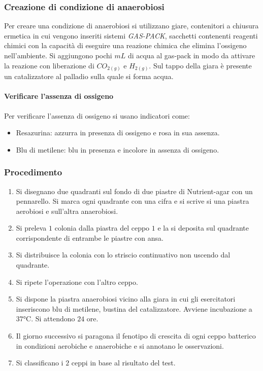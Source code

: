 		\subsubsection{Creazione di condizione di anaerobiosi}
		Per creare una condizione di anaerobiosi si utilizzano giare, contenitori a chiusura ermetica in cui vengono inseriti sistemi \emph{GAS-PACK}, sacchetti contenenti reagenti chimici con la capacit\`a di eseguire una reazione chimica che elimina l'ossigeno nell'ambiente.
		Si aggiungono pochi $\si{mL}$ di acqua al gas-pack in modo da attivare la reazione con liberazione di \emph{$CO_{2(g)}$} e \emph{$H_{2(g)}$}.
		Sul tappo della giara \`e presente un catalizzatore al palladio sulla quale si forma acqua.
		
			\paragraph{Verificare l'assenza di ossigeno}
			Per verificare l'assenza di ossigeno si usano indicatori come:
			\begin{itemize}
				\item Resazurina: azzurra in presenza di ossigeno e rosa in sua assenza.
				\item Blu di metilene: blu in presenza e incolore in assenza di ossigeno.
			\end{itemize}

		\subsubsection{Procedimento}
		\begin{enumerate}
			\item Si disegnano due quadranti sul fondo di due piastre di Nutrient-agar con un pennarello.
				Si marca ogni quadrante con una cifra e si scrive si una piastra aerobiosi e sull'altra anaerobiosi.
			\item Si preleva $1$ colonia dalla piastra del ceppo $1$ e la si deposita sul quadrante corrispondente di entrambe le piastre con ansa.
			\item Si distribuisce la colonia con lo striscio continuativo non uscendo dal quadrante.
			\item Si ripete l'operazione con l'altro ceppo. 
			\item Si dispone la piastra anaerobiosi vicino alla giara in cui gli esercitatori inseriscono blu di metilene, bustina del catalizzatore.
				Avviene incubazione a $37\si{\celsius}$.
				Si attendono $24$ ore.
			\item Il giorno successivo si paragona il fenotipo di crescita di ogni ceppo batterico in condizioni aerobiche e anaerobiche e si annotano le osservazioni.
			\item Si classificano i $2$ ceppi in base al risultato del test.
		\end{enumerate}
		
